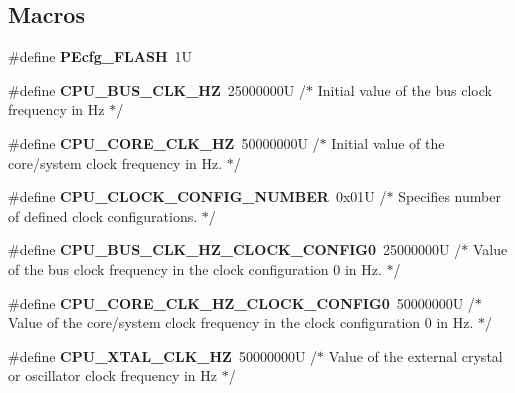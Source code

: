 \subsection*{Macros}
\begin{DoxyCompactItemize}
\item 
\hypertarget{group___cpu__module_gae2f84b335ab99b9e98d41e8a530b1540}{}\#define {\bfseries P\+Ecfg\+\_\+\+F\+L\+A\+S\+H}~1\+U\label{group___cpu__module_gae2f84b335ab99b9e98d41e8a530b1540}

\item 
\hypertarget{group___cpu__module_ga532954dc988486bfe48200c796380120}{}\#define {\bfseries C\+P\+U\+\_\+\+B\+U\+S\+\_\+\+C\+L\+K\+\_\+\+H\+Z}~25000000\+U /$\ast$ Initial value of the bus clock frequency in Hz $\ast$/\label{group___cpu__module_ga532954dc988486bfe48200c796380120}

\item 
\hypertarget{group___cpu__module_ga9dee0abd722c849e54c662ab11a1d2cf}{}\#define {\bfseries C\+P\+U\+\_\+\+C\+O\+R\+E\+\_\+\+C\+L\+K\+\_\+\+H\+Z}~50000000\+U /$\ast$ Initial value of the core/system clock frequency in Hz.  $\ast$/\label{group___cpu__module_ga9dee0abd722c849e54c662ab11a1d2cf}

\item 
\hypertarget{group___cpu__module_ga37d43e31f65dd620040aec363e95b5a8}{}\#define {\bfseries C\+P\+U\+\_\+\+C\+L\+O\+C\+K\+\_\+\+C\+O\+N\+F\+I\+G\+\_\+\+N\+U\+M\+B\+E\+R}~0x01\+U /$\ast$ Specifies number of defined clock configurations. $\ast$/\label{group___cpu__module_ga37d43e31f65dd620040aec363e95b5a8}

\item 
\hypertarget{group___cpu__module_ga39018ca5854bea36700d3b30f6c08195}{}\#define {\bfseries C\+P\+U\+\_\+\+B\+U\+S\+\_\+\+C\+L\+K\+\_\+\+H\+Z\+\_\+\+C\+L\+O\+C\+K\+\_\+\+C\+O\+N\+F\+I\+G0}~25000000\+U /$\ast$ Value of the bus clock frequency in the clock configuration 0 in Hz. $\ast$/\label{group___cpu__module_ga39018ca5854bea36700d3b30f6c08195}

\item 
\hypertarget{group___cpu__module_ga64b9007ea0c78e588ed565373bcec805}{}\#define {\bfseries C\+P\+U\+\_\+\+C\+O\+R\+E\+\_\+\+C\+L\+K\+\_\+\+H\+Z\+\_\+\+C\+L\+O\+C\+K\+\_\+\+C\+O\+N\+F\+I\+G0}~50000000\+U /$\ast$ Value of the core/system clock frequency in the clock configuration 0 in Hz. $\ast$/\label{group___cpu__module_ga64b9007ea0c78e588ed565373bcec805}

\item 
\hypertarget{group___cpu__module_gacf80ae1c70da6f1932185345fb089ce2}{}\#define {\bfseries C\+P\+U\+\_\+\+X\+T\+A\+L\+\_\+\+C\+L\+K\+\_\+\+H\+Z}~50000000\+U /$\ast$ Value of the external crystal or oscillator clock frequency in Hz $\ast$/\label{group___cpu__module_gacf80ae1c70da6f1932185345fb089ce2}


\end{DoxyCompactItemize}
